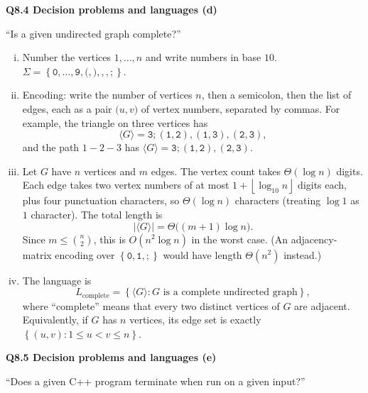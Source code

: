 \documentclass[11pt]{article}
\newcommand{\set}[1]{\left\{#1\right\}}
\newcommand{\abs}[1]{\left|#1\right|}
\newcommand{\floor}[1]{\left\lfloor #1 \right\rfloor}
\newcommand{\inner}[1]{\langle #1 \rangle}
\newcommand{\qpage}[1]{\clearpage\noindent\textbf{\large #1}\par\medskip}
\begin{document}
\qpage{Q8.4 Decision problems and languages (d)}

``Is a given undirected graph complete?''

\begin{enumerate}[(i)]
  \item Number the vertices $1, \ldots, n$ and write numbers in base $10$.
  $\Sigma = \set{\mathtt{0}, \ldots, \mathtt{9}, \mathtt{(}, \mathtt{)}, \mathtt{,}, \mathtt{;}}$.

  \item Encoding: write the number of vertices $n$, then a semicolon, then the list of edges, each as a pair $\mathtt{(}u\mathtt{,}v\mathtt{)}$ of vertex numbers, separated by commas.
  For example, the triangle on three vertices has
  \[
    \inner{G} = \mathtt{3;(1,2),(1,3),(2,3)},
  \]
  and the path $1 - 2 - 3$ has $\inner{G} = \mathtt{3;(1,2),(2,3)}$.

  \item Let $G$ have $n$ vertices and $m$ edges.
  The vertex count takes $\Theta(\log n)$ digits.
  Each edge takes two vertex numbers of at most $1 + \floor{\log_{10} n}$ digits each, plus four punctuation characters, so $\Theta(\log n)$ characters (treating $\log 1$ as $1$ character).
  The total length is
  \[
    \abs{\inner{G}} = \Theta\big((m + 1) \log n\big).
  \]
  Since $m \le \binom{n}{2}$, this is $O(n^2 \log n)$ in the worst case.
  (An adjacency-matrix encoding over $\set{\mathtt 0, \mathtt 1, \mathtt ;}$ would have length $\Theta(n^2)$ instead.)

  \item The language is
  \[
    L_{\text{complete}} = \set{\inner{G} : G \text{ is a complete undirected graph}},
  \]
  where ``complete'' means that every two distinct vertices of $G$ are adjacent.
  Equivalently, if $G$ has $n$ vertices, its edge set is exactly $\set{(u,v) : 1 \le u < v \le n}$.
\end{enumerate}

\qpage{Q8.5 Decision problems and languages (e)}

``Does a given C++ program terminate when run on a given input?''
\end{document}
